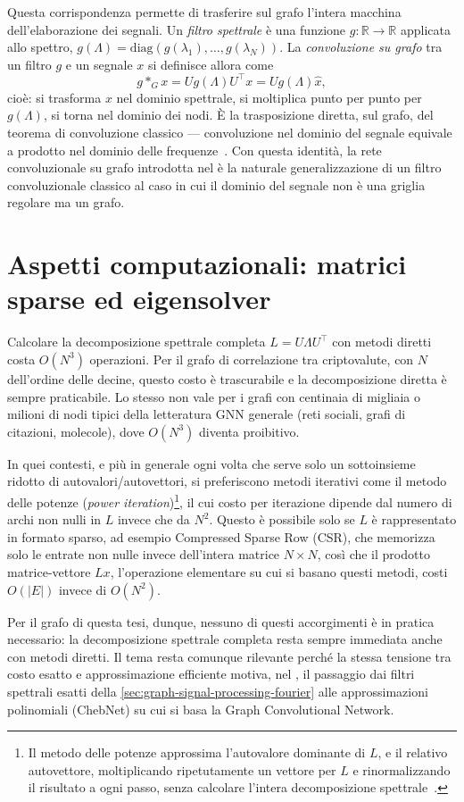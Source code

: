 Questa corrispondenza permette di trasferire sul grafo l'intera macchina dell'elaborazione dei segnali. Un \emph{filtro spettrale} è una funzione $g:\mathbb{R}\to\mathbb{R}$ applicata allo spettro, $g(\Lambda) = \mathrm{diag}(g(\lambda_1),\dots,g(\lambda_N))$. La \emph{convoluzione su grafo} tra un filtro $g$ e un segnale $x$ si definisce allora come
$$g \ast_G x = U g(\Lambda) U^\top x = U g(\Lambda) \hat x,$$
cioè: si trasforma $x$ nel dominio spettrale, si moltiplica punto per punto per $g(\Lambda)$, si torna nel dominio dei nodi. È la trasposizione diretta, sul grafo, del teorema di convoluzione classico — convoluzione nel dominio del segnale equivale a prodotto nel dominio delle frequenze~\cite{shuman2013emerging}. Con questa identità, la rete convoluzionale su grafo introdotta nel  è la naturale generalizzazione di un filtro convoluzionale classico al caso in cui il dominio del segnale non è una griglia regolare ma un grafo.

\section{Aspetti computazionali: matrici sparse ed eigensolver}
\label{sec:computational-aspects-sparse-eigensolvers}

Calcolare la decomposizione spettrale completa $L=U\Lambda U^\top$ con metodi diretti costa $O(N^3)$ operazioni. Per il grafo di correlazione tra criptovalute, con $N$ dell'ordine delle decine, questo costo è trascurabile e la decomposizione diretta è sempre praticabile. Lo stesso non vale per i grafi con centinaia di migliaia o milioni di nodi tipici della letteratura GNN generale (reti sociali, grafi di citazioni, molecole), dove $O(N^3)$ diventa proibitivo.

In quei contesti, e più in generale ogni volta che serve solo un sottoinsieme ridotto di autovalori/autovettori, si preferiscono metodi iterativi come il metodo delle potenze (\emph{power iteration})\footnote{Il metodo delle potenze approssima l'autovalore dominante di $L$, e il relativo autovettore, moltiplicando ripetutamente un vettore per $L$ e rinormalizzando il risultato a ogni passo, senza calcolare l'intera decomposizione spettrale~\cite{golub2013matrix}.}, il cui costo per iterazione dipende dal numero di archi non nulli in $L$ invece che da $N^2$. Questo è possibile solo se $L$ è rappresentato in formato sparso, ad esempio Compressed Sparse Row (CSR), che memorizza solo le entrate non nulle invece dell'intera matrice $N\times N$, così che il prodotto matrice-vettore $Lx$, l'operazione elementare su cui si basano questi metodi, costi $O(|E|)$ invece di $O(N^2)$.

Per il grafo di questa tesi, dunque, nessuno di questi accorgimenti è in pratica necessario: la decomposizione spettrale completa resta sempre immediata anche con metodi diretti. Il tema resta comunque rilevante perché la stessa tensione tra costo esatto e approssimazione efficiente motiva, nel , il passaggio dai filtri spettrali esatti della \cref{sec:graph-signal-processing-fourier} alle approssimazioni polinomiali (ChebNet) su cui si basa la Graph Convolutional Network.
